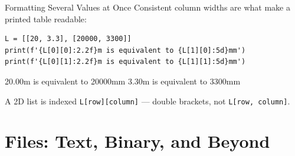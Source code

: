 \documentclass[9pt,aspectratio=169,xcolor=table]{beamer}
\begin{document}
\begin{frame}[fragile]{Formatting Several Values at Once}
    \leavevmode
    Consistent column widths are what make a printed table readable:

\begin{lstlisting}
L = [[20, 3.3], [20000, 3300]]
print(f'{L[0][0]:2.2f}m is equivalent to {L[1][0]:5d}mm')
print(f'{L[0][1]:2.2f}m is equivalent to {L[1][1]:5d}mm')
\end{lstlisting}

\begin{pyout}
20.00m is equivalent to 20000mm
3.30m is equivalent to  3300mm
\end{pyout}

    \vspace{1mm}
    {\small A 2D list is indexed \texttt{L[row][column]} --- double
    brackets, not \texttt{L[row, column]}.}
\end{frame}

\section{Files: Text, Binary, and Beyond}
\end{document}
